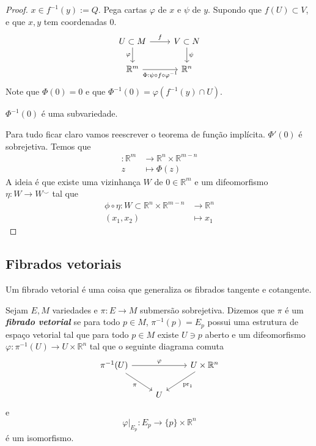 \begin{proof}\leavevmode
\(x \in f^{-1}(y):=Q\). Pega cartas \(\varphi\) de $x$ e \(\psi\) de $y$. Supondo que \(f(U) \subset V\), e que \(x,y\) tem coordenadas 0.
\[\begin{tikzcd}
	U \subset M \arrow[r,"f"]\arrow[d,swap,"\varphi"]&  V \subset N\arrow[d, "\psi"]\\
	\mathbb{R}^m \arrow[ r, swap,"\Phi:\psi \circ f \circ \varphi^{-1}"]& \mathbb{R}^n
\end{tikzcd}\]
Note que \(\Phi(0)=0\) e que \(\Phi^{-1}(0)=\varphi(f^{-1}(y) \cap U)\).
\begin{claim}\leavevmode
	\(\Phi^{-1}(0)\) é uma subvariedade.
\end{claim}
Para tudo ficar claro vamos reescrever o teorema de função implícita.  \(\Phi'(0)\) é sobrejetiva. Temos que
\begin{align*}
	: \mathbb{R}^m &\longrightarrow \mathbb{R}^n \times \mathbb{R}^{m-n} \\
	z &\longmapsto \Phi(z)
\end{align*}
A ideia é que existe uma vizinhança \(W\) de \(0 \in \mathbb{R}^m\) e um difeomorfismo \(\eta:W \to W^{\smile}\) tal que
\begin{align*}
	\phi \circ \eta: W \subset \mathbb{R}^n \times \mathbb{R}^{m-n} &\longrightarrow \mathbb{R}^n \\
	(x_1,x_2) &\longmapsto x_1
\end{align*}
\end{proof}

\subsection{Fibrados vetoriais}
Um fibrado vetorial é uma coisa que generaliza os fibrados tangente e cotangente.
\begin{defn}\leavevmode
Sejam \(E, M\) variedades e \(\pi: E \to M\) submersão sobrejetiva. Dizemos que \(\pi\) é um \textit{\textbf{fibrado vetorial}} se para todo \(p \in M\), \(\pi^{-1}(p)=E_p\) possui uma estrutura de espaço vetorial tal que para todo \(p \in M\) existe \(U \ni p\) aberto e um difeomorfismo \(\varphi: \pi^{-1}(U) \to U \times \mathbb{R}^n\) tal que o seguinte diagrama comuta
\[\begin{tikzcd}
\pi^{-1}(U)\arrow[rr,"\varphi"]\arrow[dr,swap,"\pi"]&&U \times \mathbb{R}^n\arrow[dl,"\operatorname{pr}_1"]\\
&U
\end{tikzcd}\]
e
\[\varphi|_{E_p}:E_p \to \{ p\}\times \mathbb{R}^n\]
é um isomorfismo.
\end{defn}

